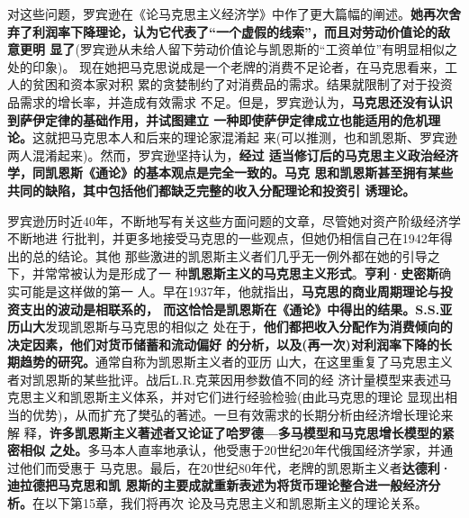 对这些问题，罗宾逊在《论马克思主义经济学》中作了更大篇幅的阐述。\textbf{她再次舍
  弃了利润率下降理论，认为它代表了“一个虚假的线索”，而且对劳动价值论的敌意更明
  显了}(罗宾逊从未给人留下劳动价值论与凯恩斯的“工资单位”有明显相似之处的印象)。
现在她把马克思说成是一个老牌的消费不足论者，在马克思看来，工人的贫困和资本家对积
累的贪婪制约了对消费品的需求。结果就限制了对于投资品需求的增长率，并造成有效需求
不足。但是，罗宾逊认为，\textbf{马克思还没有认识到萨伊定律的基础作用，并试图建立
  一种即使萨伊定律成立也能适用的危机理论。}这就把马克思本人和后来的理论家混淆起
来(可以推测，也和凯恩斯、罗宾逊两人混淆起来)。然而，罗宾逊坚持认为，\textbf{经过
  适当修订后的马克思主义政治经济学，同凯恩斯《通论》的基本观点是完全一致的。马克
  思和凯恩斯甚至拥有某些共同的缺陷，其中包括他们都缺乏完整的收入分配理论和投资引
  诱理论。}

罗宾逊历时近40年，不断地写有关这些方面问题的文章，尽管她对资产阶级经济学不断地进
行批判，并更多地接受马克思的一些观点，但她仍相信自己在1942年得出的总的结论。其他
那些激进的凯恩斯主义者们几乎无一例外都在她的引导之下，并常常被认为是形成了一
种\textbf{凯恩斯主义的马克思主义形式}。\textbf{亨利·史密斯}确实可能是这样做的第一
人。早在1937年，他就指出，\textbf{马克思的商业周期理论与投资支出的波动是相联系的，
  而这恰恰是凯恩斯在《通论》中得出的结果。S.S.亚历山大}发现凯恩斯与马克思的相似之
处在于，\textbf{他们都把收入分配作为消费倾向的决定因素，他们对货币储蓄和流动偏好
  的分析，以及(再一次)对利润率下降的长期趋势的研究。}通常自称为凯恩斯主义者的亚历
山大，在这里重复了马克思主义者对凯恩斯的某些批评。战后L.R.克莱因用参数值不同的经
济计量模型来表述马克思主义和凯恩斯主义体系，并对它们进行经验检验(由此马克思的理论
显现出相当的优势)，从而扩充了樊弘的著述。一旦有效需求的长期分析由经济增长理论来解
释，\textbf{许多凯恩斯主义著述者又论证了哈罗德—多马模型和马克思增长模型的紧密相似
  之处。}多马本人直率地承认，他受惠于20世纪20年代俄国经济学家，并通过他们而受惠于
马克思。最后，在20世纪80年代，老牌的凯恩斯主义者\textbf{达德利·迪拉德把马克思和凯
  恩斯的主要成就重新表述为将货币理论整合进一般经济分析。}在以下第15章，我们将再次
论及马克思主义和凯恩斯主义的理论关系。

